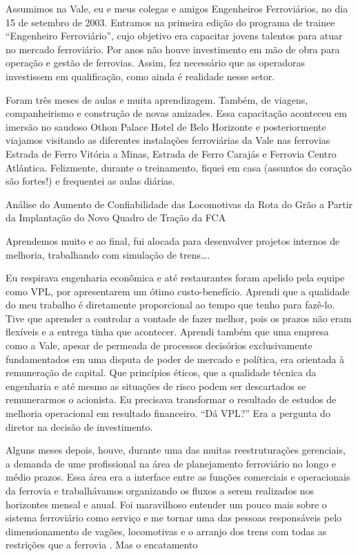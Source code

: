 \documentclass[
]{book}
\begin{document}
Assumimos na Vale, eu e meus colegas e amigos Engenheiros Ferroviários, no dia 15 de setembro de 2003. Entramos na primeira edição do programa de trainee ``Engenheiro Ferroviário'', cujo objetivo era capacitar jovens talentos para atuar no mercado ferroviário. Por anos não houve investimento em mão de obra para operação e gestão de ferrovias. Assim, fez necessário que as operadoras investissem em qualificação, como ainda é realidade nesse setor.

Foram três meses de aulas e muita aprendizagem. Também, de viagens, companheirismo e construção de novas amizades. Essa capacitação aconteceu em imersão no saudoso Othon Palace Hotel de Belo Horizonte e posteriormente viajamos visitando as diferentes instalações ferroviárias da Vale nas ferrovias Estrada de Ferro Vitória a Minas, Estrada de Ferro Carajás e Ferrovia Centro Atlântica. Felizmente, durante o treinamento, fiquei em casa (assuntos do coração são fortes!) e frequentei as aulas diárias.

Análise do Aumento de Confiabilidade das Locomotivas da Rota do Grão a Partir da Implantação do Novo Quadro de Tração da FCA

Aprendemos muito e ao final, fui alocada para desenvolver projetos internos de melhoria, trabalhando com simulação de trens\ldots.

Eu respirava engenharia econômica e até restaurantes foram apelido pela equipe como VPL, por apresentarem um ótimo custo-benefício. Aprendi que a qualidade do meu trabalho é diretamente proporcional ao tempo que tenho para fazê-lo. Tive que aprender a controlar a vontade de fazer melhor, pois os prazos não eram flexíveis e a entrega tinha que acontecer. Aprendi também que uma empresa como a Vale, apesar de permeada de processos decisórios exclusivamente fundamentados em uma disputa de poder de mercado e política, era orientada à remuneração de capital. Que princípios éticos, que a qualidade técnica da engenharia e até mesmo as situações de risco podem ser descartados se remunerarmos o acionista. Eu precisava transformar o resultado de estudos de melhoria operacional em resultado financeiro. ``Dá VPL?'' Era a pergunta do diretor na decisão de investimento.

Alguns meses depois, houve, durante uma das muitas reestruturações gerenciais, a demanda de ume profissional na área de planejamento ferroviário no longo e médio prazos. Essa área era a interface entre as funções comerciais e operacionais da ferrovia e trabalhávamos organizando os fluxos a serem realizados nos horizontes mensal e anual. Foi maravilhoso entender um pouco mais sobre o sistema ferroviário como serviço e me tornar uma das pessoas responsáveis pelo dimensionamento de vagões, locomotivas e o arranjo dos trens com todas as restrições que a ferrovia . Mas o encatamento
\end{document}
